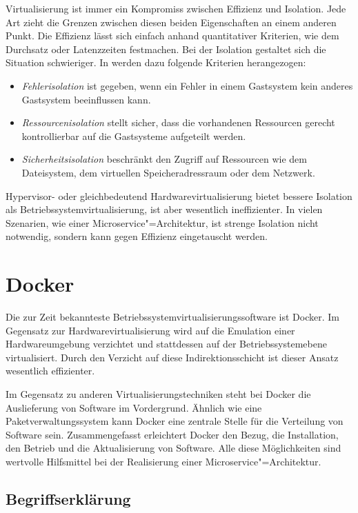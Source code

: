 Virtualisierung ist immer ein Kompromiss zwischen Effizienz und Isolation. Jede Art zieht die Grenzen zwischen diesen beiden Eigenschaften an einem anderen Punkt. Die Effizienz lässt sich einfach anhand quantitativer Kriterien, wie dem Durchsatz oder Latenzzeiten festmachen. Bei der Isolation gestaltet sich die Situation schwieriger. In \cite{Soltesz:2007:COS:1272996.1273025} werden dazu folgende Kriterien herangezogen:

\begin{itemize}
	\item \textit{Fehlerisolation} ist gegeben, wenn ein Fehler in einem Gastsystem kein anderes Gastsystem beeinflussen kann.
	\item \textit{Ressourcenisolation} stellt sicher, dass die vorhandenen Ressourcen gerecht \bzw kontrollierbar auf die Gastsysteme aufgeteilt werden.
	\item \textit{Sicherheitsisolation} beschränkt den Zugriff auf Ressourcen wie dem Dateisystem, dem virtuellen Speicheradressraum oder dem Netzwerk.
\end{itemize}

Hypervisor- oder gleichbedeutend Hardwarevirtualisierung bietet bessere Isolation als Betriebssystemvirtualisierung, ist aber wesentlich ineffizienter. In vielen Szenarien, wie einer Microservice"=Architektur, ist strenge Isolation nicht notwendig, sondern kann gegen Effizienz eingetauscht werden.

\section{Docker}

Die zur Zeit bekannteste Betriebssystemvirtualisierungssoftware ist Docker. Im Gegensatz zur Hardwarevirtualisierung wird auf die Emulation einer Hardwareumgebung verzichtet und stattdessen auf der Betriebssystemebene virtualisiert. Durch den Verzicht auf diese Indirektionsschicht ist dieser Ansatz wesentlich effizienter.

Im Gegensatz zu anderen Virtualisierungstechniken steht bei \mbox{Docker} die Auslieferung von Software im Vordergrund. Ähnlich wie eine Paketverwaltungssystem kann Docker eine zentrale Stelle für die Verteilung von Software sein. Zusammengefasst erleichtert Docker den Bezug, die Installation, den Betrieb und die Aktualisierung von Software. Alle diese Möglichkeiten sind wertvolle Hilfsmittel bei der Realisierung einer Microservice"=Architektur.

\subsection{Begriffserklärung}


